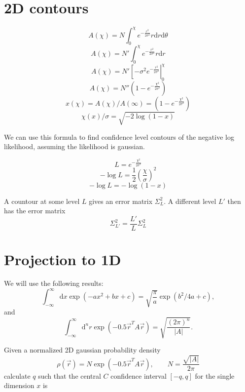 \documentclass[12pt]{article}
\newcommand{\dee}{\mathrm{d}}
\newcommand{\abs}[1]{\left|#1\right|}
\begin{document}
\section{2D contours}

\[A(\chi) = N\int_0^\chi e^{-\frac{r^2}{2\sigma^2}} r\dee r\dee\theta\]
\[A(\chi) = N'\int_0^\chi e^{-\frac{r^2}{2\sigma^2}} r\dee r\]
\[A(\chi) = N'\left[-\sigma^2e^{-\frac{r^2}{2\sigma^2}}\right|_0^\chi\]
\[A(\chi) = N''\left(1-e^{-\frac{\chi^2}{2\sigma^2}}\right)\]
\[x(\chi) = A(\chi)/A(\infty) = \left(1-e^{-\frac{\chi^2}{2\sigma^2}}\right)\]
\[\chi(x)/\sigma = \sqrt{-2\log(1-x)}\]

We can use this formula to find confidence level contours of the
negative log likelihood, assuming the likelihood is gaussian.

\[L = e^{-\frac{\chi^2}{2\sigma^2}}\]
\[-\log L = \frac{1}{2}\left(\frac{\chi}{\sigma}\right)^2\]
\[-\log L = -\log( 1-x )\]

A countour at some level $L$ gives an error matrix $\Sigma^2_L$.  A
different level $L'$ then has the error matrix
\[\Sigma^2_{L'} = \frac{L'}{L}\Sigma^2_L\]

\section{Projection to 1D}

We will use the following results:
\begin{equation}
  \int_{-\infty}^{\infty}\dee x \exp\left(-ax^2+bx+c\right) = \sqrt{\frac{\pi}{a}}\exp\left(b^2/4a + c\right),
\end{equation}
and
\begin{equation}
  \int_{-\infty}^\infty \dee^nr\exp\left(-0.5 \vec{r}^TA\vec{r}\right) = \sqrt{\frac{(2\pi)^n}{\abs{A}}}.
\end{equation}

Given a normalized 2D gaussian probability density
\[
\rho(\vec{r}) = N \exp(-0.5 \vec{r}^TA\vec{r}), \qquad N = \frac{\sqrt{\abs{A}}}{2\pi}
\]
calculate $q$ such that the central $C$ confidence interval $[-q,q]$
for the single dimension $x$ is
\end{document}
